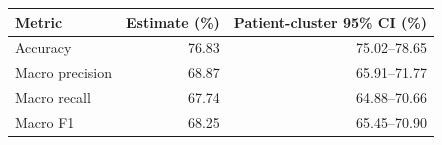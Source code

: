 \begin{tabular}{lrr}
\toprule
Metric & Estimate (\%) & Patient-cluster 95\% CI (\%) \\
\midrule
Accuracy & 76.83 & 75.02--78.65 \\
Macro precision & 68.87 & 65.91--71.77 \\
Macro recall & 67.74 & 64.88--70.66 \\
Macro F1 & 68.25 & 65.45--70.90 \\
\bottomrule
\end{tabular}
